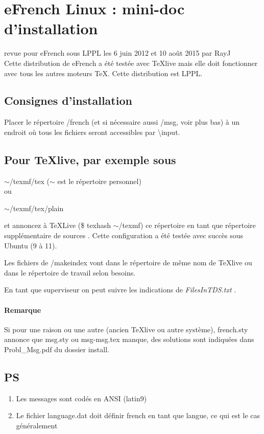 \documentclass[11pt,a4paper]{article}
\author{Raymond Juillerat}
\begin{document}
\section*{eFrench Linux : mini-doc d'installation }
revue pour eFrench sous LPPL les 6 juin 2012 et 10  août 2015  par RayJ\\[3ex]

  Cette distribution de eFrench a été testée avec \TeX{}live mais elle doit 
fonctionner avec tous les autres moteurs \TeX. Cette distribution
est LPPL. 

  
\subsection*{Consignes d'installation}

 Placer le répertoire /french (et si nécessaire aussi /msg, voir plus bas) à un endroit où 
   tous les fichiers seront accessibles par{ \backslash}input.
\subsection*{Pour \TeX{}live, par exemple sous } 
   $\sim$/texmf/tex\hspace{1cm}
($\sim$ est le répertoire personnel)\\
ou

   $\sim$/texmf/tex/plain

   et annoncez à TeXLive (\$ texhash $\sim$/texmf)
   ce répertoire en tant que répertoire supplémentaire de sources .   
Cette configuration a été testée avec succès sous Ubuntu (9 à 11).

Les fichiers de /makeindex vont dans le répertoire de même nom de  \TeX{}live
ou dans le répertoire de travail selon besoins.

En tant que superviseur on peut suivre les indications de \emph{FilesInTDS.txt} .

\paragraph*{Remarque}
Si pour une raison ou une autre (ancien \TeX{}live ou autre système), french.sty annonce que msg.sty  ou msg-msg.tex manque, 
des solutions sont indiquées dans Probl\_Msg.pdf du dossier install.
\subsection*{PS}
\begin{enumerate}
\item Les messages sont codés en ANSI (latin9) 
\item    Le fichier language.dat doit définir french en tant
	 que langue, ce qui est le cas généralement
\end{enumerate}
\end{document}
